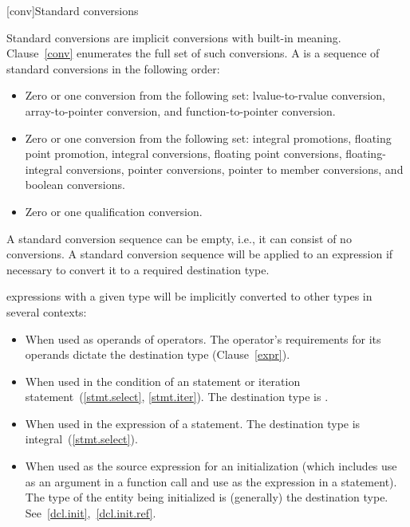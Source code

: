 [conv]{Standard conversions}

%

\pnum
{}%
%
Standard conversions are implicit conversions with built-in meaning.
Clause~\ref{conv} enumerates the full set of such conversions. A
%
 is a sequence of standard
conversions in the following order:

\begin{itemize}
\item Zero or one conversion from the following set: lvalue-to-rvalue
conversion, array-to-pointer conversion, and function-to-pointer
conversion.

\item Zero or one conversion from the following set: integral
promotions, floating point promotion, integral conversions, floating
point conversions, floating-integral conversions, pointer conversions,
pointer to member conversions, and boolean conversions.

\item Zero or one qualification conversion.
\end{itemize}

\enternote
A standard conversion sequence can be empty, i.e., it can consist of no
conversions. \exitnote A standard conversion sequence will be applied to
an expression if necessary to convert it to a required destination type.

\pnum
\enternote 
expressions with a given type will be implicitly converted to other
types in several contexts:

\begin{itemize}
\item When used as operands of operators. The operator's requirements
for its operands dictate the destination type (Clause~\ref{expr}).

\item When used in the condition of an  statement or iteration
statement~(\ref{stmt.select}, \ref{stmt.iter}). The destination type is
.

\item When used in the expression of a  statement. The
destination type is integral~(\ref{stmt.select}).

\item When used as the source expression for an initialization (which
includes use as an argument in a function call and use as the expression
in a  statement). The type of the entity being initialized
is (generally) the destination type.
See~\ref{dcl.init},~\ref{dcl.init.ref}.
\end{itemize}
\exitnote 


